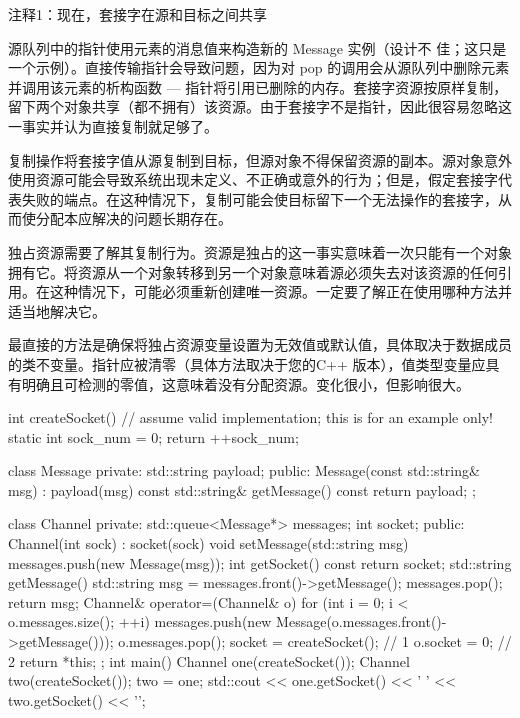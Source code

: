 {\footnotesize
注释1：现在，套接字在源和目标之间共享
}


源队列中的指针使用元素的消息值来构造新的 Message 实例（设计不 佳；这只是一个示例）。直接传输指针会导致问题，因为对 pop 的调用会从源队列中删除元素并调用该元素的析构函数 — 指针将引用已删除的内存。套接字资源按原样复制，留下两个对象共享（都不拥有）该资源。由于套接字不是指针，因此很容易忽略这一事实并认为直接复制就足够了。

复制操作将套接字值从源复制到目标，但源对象不得保留资源的副本。源对象意外使用资源可能会导致系统出现未定义、不正确或意外的行为；但是，假定套接字代表失败的端点。在这种情况下，复制可能会使目标留下一个无法操作的套接字，从而使分配本应解决的问题长期存在。

独占资源需要了解其复制行为。资源是独占的这一事实意味着一次只能有一个对象拥有它。将资源从一个对象转移到另一个对象意味着源必须失去对该资源的任何引用。在这种情况下，可能必须重新创建唯一资源。一定要了解正在使用哪种方法并适当地解决它。


最直接的方法是确保将独占资源变量设置为无效值或默认值，具体取决于数据成员的类不变量。指针应被清零（具体方法取决于您的C++ 版本），值类型变量应具有明确且可检测的零值，这意味着没有分配资源。变化很小，但影响很大。


\begin{cpp}
int createSocket() {
  // assume valid implementation; this is for an example only!
  static int sock_num = 0;
  return ++sock_num;
}

class Message {
private:
  std::string payload;
public:
  Message(const std::string& msg) : payload(msg) {}
  const std::string& getMessage() const { return payload; }
};

class Channel {
private:
  std::queue<Message*> messages;
  int socket;
public:
  Channel(int sock) : socket(sock) {}
  void setMessage(std::string msg) { messages.push(new Message(msg)); }
  int getSocket() const { return socket; }
  std::string getMessage() {
    std::string msg = messages.front()->getMessage();
    messages.pop();
    return msg;
  }
  Channel& operator=(Channel& o) {
    for (int i = 0; i < o.messages.size(); ++i) {
      messages.push(new Message(o.messages.front()->getMessage()));
    o.messages.pop();
    }
    socket = createSocket(); // 1
    o.socket = 0; // 2
    return *this;
  }
};
int main() {
  Channel one(createSocket());
  Channel two(createSocket());
  two = one;
  std::cout << one.getSocket() << ' ' << two.getSocket() << '\n';
}
\end{cpp}

